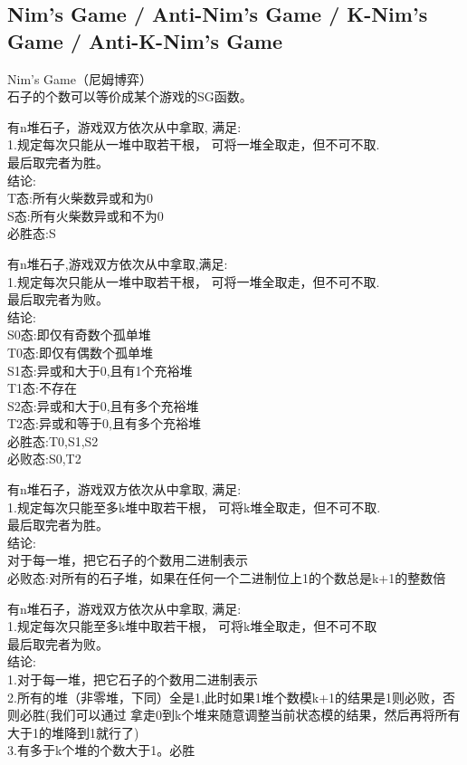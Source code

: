 \documentclass[10pt]{ctexart}
\begin{document}
{\subsection{Nim’s Game / Anti-Nim's Game / K-Nim's Game / Anti-K-Nim's Game}
Nim’s Game（尼姆博弈）\\
石子的个数可以等价成某个游戏的SG函数。\\
\par
有n堆石子，游戏双方依次从中拿取, 满足:\\
1.规定每次只能从一堆中取若干根， 可将一堆全取走，但不可不取.\\
最后取完者为胜。\\
结论:\\
T态:所有火柴数异或和为0\\
S态:所有火柴数异或和不为0\\
必胜态:S\\
\par
有n堆石子,游戏双方依次从中拿取,满足:\\
1.规定每次只能从一堆中取若干根， 可将一堆全取走，但不可不取.\\
最后取完者为败。\\
结论:\\
S0态:即仅有奇数个孤单堆\\
T0态:即仅有偶数个孤单堆\\
S1态:异或和大于0,且有1个充裕堆\\
T1态:不存在\\
S2态:异或和大于0,且有多个充裕堆\\
T2态:异或和等于0,且有多个充裕堆\\
必胜态:T0,S1,S2\\
必败态:S0,T2\\
\par
有n堆石子，游戏双方依次从中拿取, 满足:\\
1.规定每次只能至多k堆中取若干根， 可将k堆全取走，但不可不取.\\
最后取完者为胜。\\
结论:\\
对于每一堆，把它石子的个数用二进制表示\\
必败态:对所有的石子堆，如果在任何一个二进制位上1的个数总是k+1的整数倍\\
\par
有n堆石子，游戏双方依次从中拿取, 满足:\\
1.规定每次只能至多k堆中取若干根， 可将k堆全取走，但不可不取\\
最后取完者为败。\\
结论:\\
1.对于每一堆，把它石子的个数用二进制表示\\
2.所有的堆（非零堆，下同）全是1,此时如果1堆个数模k+1的结果是1则必败，否则必胜(我们可以通过 拿走0到k个堆来随意调整当前状态模的结果，然后再将所有大于1的堆降到1就行了)\\
3.有多于k个堆的个数大于1。必胜\\
}
\end{document}
